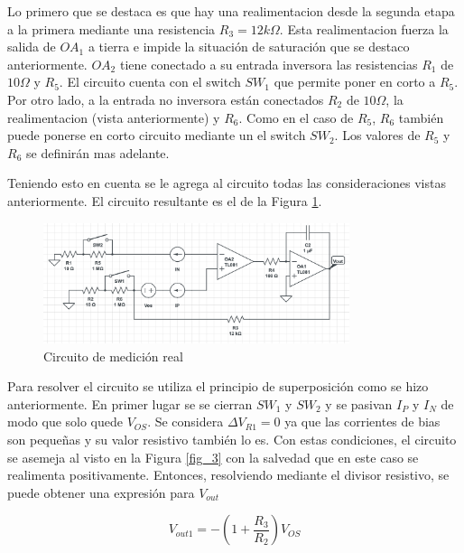 Lo primero que se destaca es que hay una realimentacion desde la segunda etapa a la primera mediante una resistencia $R_3 = 12k\Omega$. Esta realimentacion fuerza la salida de $OA_1$ a tierra e impide la situación de saturación que se destaco
anteriormente.  $OA_2$ tiene conectado a su entrada inversora las resistencias $R_1$ de $10\Omega$ y $R_5$. El circuito cuenta con el switch $SW_1$ que permite poner en corto a $R_5$. Por otro lado,
a la entrada no inversora están conectados $R_2$ de $10\Omega$, la realimentacion (vista anteriormente) y $R_6$. Como en el caso de $R_5$, $R_6$ también puede
ponerse en corto circuito mediante un el switch $SW_2$. Los valores de $R_5$ y $R_6$ se definirán mas adelante. 

Teniendo esto en cuenta se le agrega al circuito todas las consideraciones vistas anteriormente. El circuito resultante es el de la Figura \ref{medicion_real}.

\begin{figure}[ht]                                                       
    \centering\includegraphics[width=0.8\textwidth]{../Ex3/Figuras/fig_8.png}
     \caption{Circuito de medición real}
     \label{medicion_real}
     \end{figure}

Para resolver el circuito se utiliza el principio de superposición como se hizo anteriormente. En primer lugar se se cierran $SW_1$ y $SW_2$ y se pasivan $I_P$ y $I_N$ de modo que solo quede $V_{OS}$.
Se considera $\Delta V_{R1} = 0$ ya que las corrientes de bias son pequeñas y su valor resistivo también lo es. Con estas condiciones, el circuito se asemeja al visto en la Figura \ref{fig_3} con la salvedad que en este caso se realimenta positivamente. Entonces, resolviendo
mediante el divisor resistivo, se puede obtener una expresión para $V_{out}$

\begin{equation} V_{out1} = -(1 + \frac{R_3}{R_2})V_{OS} \label{ecuacion_Vout_1}\end{equation}

